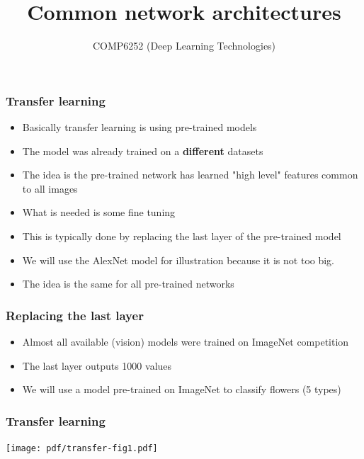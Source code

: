 \documentclass{beamer}
\begin{document}
\title{Common network architectures}
\author{COMP6252 (Deep Learning Technologies)}
\date{}
 \date{}
\begin{frame}
    \placelogofalse %
    \titlepage
\end{frame}
    
\placelogotrue
\begin{frame}
	\frametitle{Transfer learning}
\begin{itemize}
	
\item  Basically transfer learning is using pre-trained models
\item The model was already trained on a \textbf{different} datasets
\item The idea is the pre-trained network has learned "high level" features common to all images
\item  What is needed is some fine tuning
\item This is typically done by replacing the last layer of the pre-trained model
\item We will use the AlexNet model for illustration because it is not too big.
\item The idea is the same for all pre-trained networks
\end{itemize}
\end{frame}

\begin{frame}
    \frametitle{Replacing the last layer}
\begin{itemize}
    \item Almost all available (vision) models were trained on ImageNet competition
    \item The last layer outputs 1000 values
    \item We will use a model pre-trained on ImageNet to classify flowers (5 types)
\end{itemize}
\end{frame}


\begin{frame}
    \frametitle{Transfer learning}
\begin{center}
    \texttt{[image: pdf/transfer-fig1.pdf]}
\end{center}
\end{frame}
\end{document}
